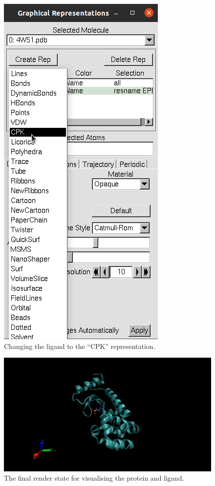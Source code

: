     \begin{figure}[H]
        \centering
        \includegraphics[height=0.4\textheight]{Graphics/ScreenShots/CPK.png}
        \caption{Changing the ligand to the \enquote{CPK} representation.}
        \label{fig:CPK}
    \end{figure}

    \begin{figure}[H]
        \centering
        \includegraphics[width=.9\textwidth]{Graphics/ScreenShots/CartoonRender.png}
        \caption{The final render state for visualising the protein and ligand.}
        \label{fig:FinalRender}
    \end{figure}

